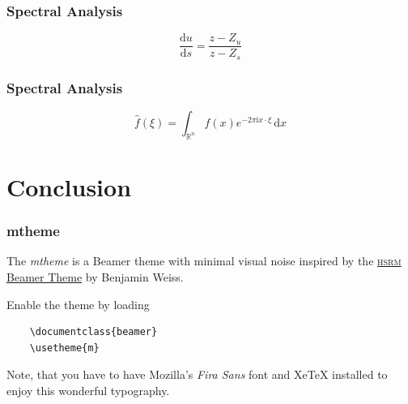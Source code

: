 \documentclass[12pt, compress]{beamer}
\begin{document}
\begin{frame}[fragile]
	\frametitle{Spectral Analysis}
	
	\begin{center}
		
		\hspace{1cm}
		
	\end{center}
	
	\begin{equation*}
		\frac{\text{d}u}{\text{d}s} = \frac{z - Z_u}{z - Z_s}
	\end{equation*}
	
\end{frame}

\begin{frame}[fragile]
	\frametitle{Spectral Analysis}
	
	\begin{center}
		
		\hspace{1cm}
		
	\end{center}
	
	\begin{equation*}
		\widehat{f}(\xi) = \int_{\mathbb{R}^n} f(x) e^{-2 \pi \text{i} x \cdot \xi} \, \text{d}x
	\end{equation*}
	
\end{frame}

\section{Conclusion}











\begin{frame}[fragile]
  \frametitle{mtheme}

  The \emph{mtheme} is a Beamer theme with minimal visual noise inspired by the
  \href{https://github.com/hsrmbeamertheme/hsrmbeamertheme}{\textsc{hsrm} Beamer
  Theme} by Benjamin Weiss.

  Enable the theme by loading

  \begin{verbatim}
    \documentclass{beamer}
    \usetheme{m}
  \end{verbatim}

  Note, that you have to have Mozilla's \emph{Fira Sans} font and XeTeX
  installed to enjoy this wonderful typography.
\end{frame}
\end{document}
